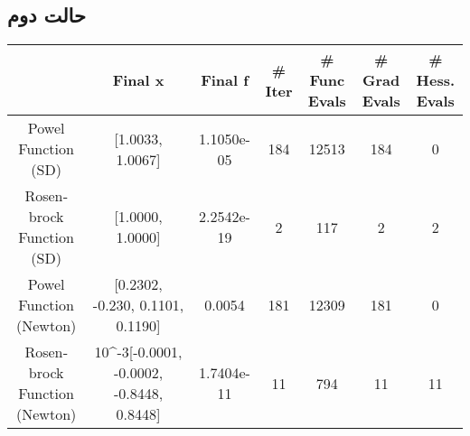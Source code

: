 \documentclass{article}
\begin{document}
\begin{landscape}
\section{حالت دوم}
\begin{latin}
\begin{table}[h!]
	\begin{tabular}{|c|c|c|c|c|c|c|}
		\hline
		& \textbf{Final x}                                              & Final f    & \# Iter & \# Func Evals & \# Grad Evals & \# Hess. Evals \\ \hline
		Powel Function  (SD)         & {[}1.0033, 1.0067{]}                                          & 1.1050e-05 & 184     & 12513         & 184           & 0              \\ \hline
		Rosenbrock Function (SD)     & {[}1.0000, 1.0000{]}                                          & 2.2542e-19 & 2       & 117           & 2             & 2              \\ \hline
		Powel Function (Newton)      & {[}0.2302, -0.230, 0.1101, 0.1190{]}                          & 0.0054     & 181     & 12309         & 181           & 0              \\ \hline
		Rosenbrock Function (Newton) & 10\textasciicircum{}-3{[}-0.0001, -0.0002, -0.8448, 0.8448{]} & 1.7404e-11 & 11      & 794           & 11            & 11             \\ \hline
	\end{tabular}
\end{table}
\end{latin}
\end{landscape}
\end{document}
